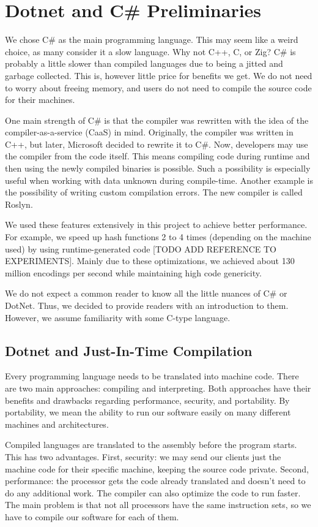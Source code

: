 \chapter{Dotnet and C\# Preliminaries}

We chose C\# as the main programming language. This may seem like a weird choice, as many consider it a slow language. Why not C++, C, or Zig? C\# is probably a little slower than compiled languages due to being a jitted and garbage collected. This is, however little price for benefits we get. We do not need to worry about freeing memory, and users do not need to compile the source code for their machines.

One main strength of C\# is that the compiler was rewritten with the idea of the compiler-as-a-service (CaaS) in mind. Originally, the compiler was written in C++, but later, Microsoft decided to rewrite it to C\#. Now, developers may use the compiler from the code itself.  This means compiling code during runtime and then using the newly compiled binaries is possible. Such a possibility is especially useful when working with data unknown during compile-time. Another example is the possibility of writing custom compilation errors. The new compiler is called Roslyn.

We used these features extensively in this project to achieve better performance. For example, we speed up hash functions 2 to 4 times (depending on the machine used) by using runtime-generated code [TODO ADD  REFERENCE TO EXPERIMENTS]. Mainly due to these optimizations, we achieved about 130 million encodings per second while maintaining high code genericity.

We do not expect a common reader to know all the little nuances of C\# or DotNet. Thus, we decided to provide readers with an introduction to them. However, we assume familiarity with some C-type language.

\section{Dotnet and Just-In-Time Compilation}

Every programming language needs to be translated into machine code. There are two main approaches: compiling and interpreting. Both approaches have their benefits and drawbacks regarding performance, security, and portability. By portability, we mean the ability to run our software easily on many different machines and architectures.

Compiled languages are translated to the assembly before the program starts. This has two advantages. First, security: we may send our clients just the machine code for their specific machine, keeping the source code private. Second, performance: the processor gets the code already translated and doesn't need to do any additional work. The compiler can also optimize the code to run faster. The main problem is that not all processors have the same instruction sets, so we have to compile our software for each of them.

